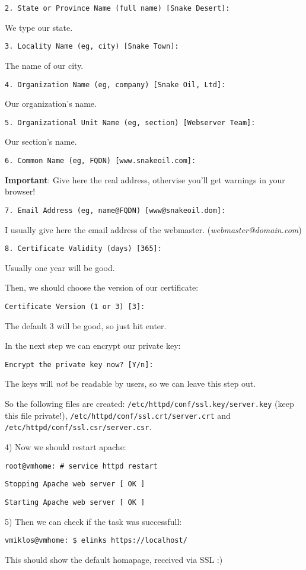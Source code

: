 {\tt 2. State or Province Name   (full name)     [Snake Desert]:}

We type our state.

{\tt 3. Locality Name            (eg, city)      [Snake Town]:}

The name of our city.

{\tt 4. Organization Name        (eg, company)   [Snake Oil, Ltd]:}

Our organization's name.

{\tt 5. Organizational Unit Name (eg, section)   [Webserver Team]:}

Our section's name.

{\tt 6. Common Name              (eg, FQDN)      [www.snakeoil.com]:}

\textbf{Important}: Give here the real address, othervise you'll get warnings in your browser!

{\tt 7. Email Address            (eg, name@FQDN) [www@snakeoil.dom]:}

I usually give here the email address of the webmaster. (\textit{webmaster@domain.com})

{\tt 8. Certificate Validity     (days)          [365]:}

Usually one year will be good.

Then, we should choose the version of our certificate:

{\tt Certificate Version (1 or 3) [3]:}

The default 3 will be good, so just hit enter.

In the next step we can encrypt our private key:

{\tt Encrypt the private key now? [Y/n]:}

The keys will \textit{not} be readable by users, so we can leave this step out.

So the following files are created: {\tt /etc/httpd/conf/ssl.key/server.key} (keep this file private!), {\tt /etc/httpd/conf/ssl.crt/server.crt} and {\tt /etc/httpd/conf/ssl.csr/server.csr}.

4) Now we should restart apache:

{\tt root@vmhome:~# service httpd restart}

{\tt Stopping Apache web server [  OK  ]}

{\tt Starting Apache web server [  OK  ]}

5) Then we can check if the task was successfull:

{\tt vmiklos@vmhome:~\$ elinks https://localhost/}

This should show the default homapage, received via SSL :)
